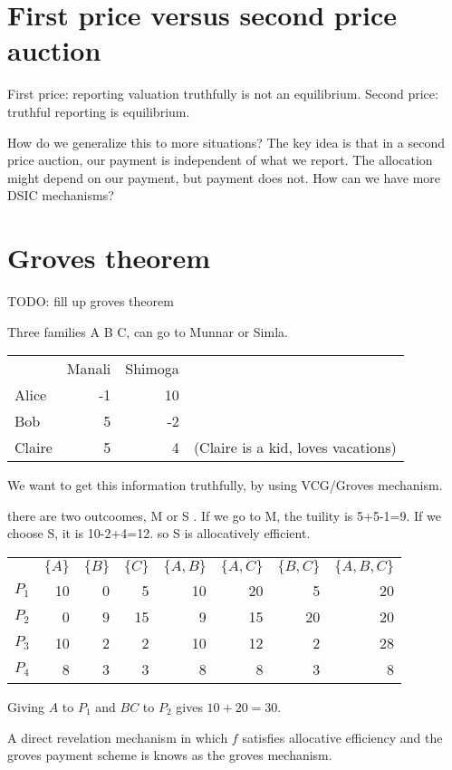 \documentclass[10pt,a4paper]{article}
\begin{document}
\section{First price versus second price auction}
First price: reporting valuation truthfully is not an equilibrium. Second
price: truthful reporting is equilibrium.

How do we generalize this to more situations? The key idea is that in a second
price auction, our payment is independent of what we report. The allocation
might depend on our payment, but payment does not. How can we have more
DSIC mechanisms?

\section{Groves theorem}
TODO: fill up groves theorem



Three families A B C, can go to Munnar or Simla. 


\begin{tabular}{l r r l}
  &  Manali &  Shimoga & \\
Alice & -1 &  10 & \\
Bob & 5  & -2  & \\
Claire & 5  & 4  & (Claire is a kid, loves vacations) \\
\end{tabular}

We want to get this information truthfully, by using VCG/Groves mechanism.

there are two outcoomes, M or S . If we go to M, the tuility is 5+5-1=9. If
we choose S, it is 10-2+4=12. so S is allocatively efficient.



\begin{tabular}{l r r r r r r r}
    & $\{ A \}$  & $\{ B \}$   & $\{ C \}$  &  $\{ A, B \}$ & $\{ A, C \}$ & $\{ B, C  \}$ & $\{  A, B, C \}$ \\
$P_1$  & 10 & 0   & 5  &  10  &  20 &   5  &  20 \\
$P_2$  & 0  & 9   & 15  &  9  &  15 &  20  &  20 \\
$P_3$  & 10 &  2   & 2  &  10  &  12 &  2  &   28 \\
$P_4$  & 8  &  3   & 3  &  8  &   8 &   3  &    8
\end{tabular}


Giving $A$ to $P_1$ and $BC$ to $P_2$ gives $10 + 20 = 30$.


A direct revelation mechanism in which $f$ satisfies allocative efficiency
and the groves payment scheme is knows as the groves mechanism.
\end{document}
